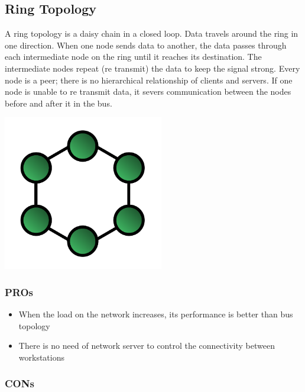 \documentclass[a4paper,12pt]{article}
\begin{document}
\clearpage

\subsection{Ring Topology}

A ring topology is a daisy chain in a closed loop. Data travels around the ring in one direction. When one node sends data to another, the data passes through each intermediate node on the ring until it reaches its destination. The intermediate nodes repeat (re transmit) the data to keep the signal strong.\footnotemark{} Every node is a peer; there is no hierarchical relationship of clients and servers. If one node is unable to re transmit data, it severs communication between the nodes before and after it in the bus.

\noindent \includegraphics[width=7cm]{./RingNetwork.svg.PNG} \newline
{}

\subsubsection{PROs}

\begin{itemize}
\item {When the load on the network increases, its performance is better than bus topology}
\item {There is no need of network server to control the connectivity between workstations}
\end{itemize}

\subsubsection{CONs}
\end{document}
